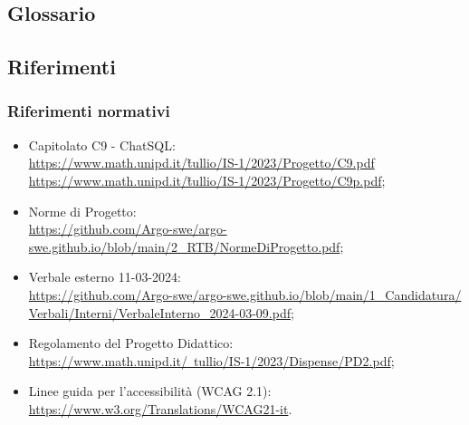 \subsection{Glossario}
\GlossarioIntroduzione

\subsection{Riferimenti}
\subsubsection{Riferimenti normativi}
\begin{itemize}
  \item Capitolato C9 - ChatSQL:\\ \href{https://www.math.unipd.it/~tullio/IS-1/2023/Progetto/C9.pdf}{https://www.math.unipd.it/\~tullio/IS-1/2023/Progetto/C9.pdf} \\ \href{https://www.math.unipd.it/~tullio/IS-1/2023/Progetto/C9.pdf}{https://www.math.unipd.it/\~tullio/IS-1/2023/Progetto/C9p.pdf};
  \item Norme di Progetto:\\ \href{https://github.com/Argo-swe/argo-swe.github.io/blob/main/2_RTB/NormeDiProgetto.pdf}{https://github.com/Argo-swe/argo-swe.github.io/blob/main/2\_RTB/\-NormeDiProgetto.pdf};
  \item Verbale esterno 11-03-2024:\\ \href{https://github.com/Argo-swe/argo-swe.github.io/blob/main/1_Candidatura/Verbali/Interni/VerbaleInterno_2024-03-09.pdf}{https://github.com/Argo-swe/argo-swe.github.io/blob/main/1\_Candidatura/ \\ Verbali/Interni/VerbaleInterno\_2024-03-09.pdf};
  \item Regolamento del Progetto Didattico:\\ \href{https://www.math.unipd.it/~tullio/IS-1/2023/Dispense/PD2.pdf}{https://www.math.unipd.it/~tullio/IS-1/2023/Dispense/PD2.pdf};
  \item Linee guida per l'accessibilità (WCAG 2.1):\\ \href{https://www.w3.org/Translations/WCAG21-it}{https://www.w3.org/Translations/WCAG21-it}.
\end{itemize}

